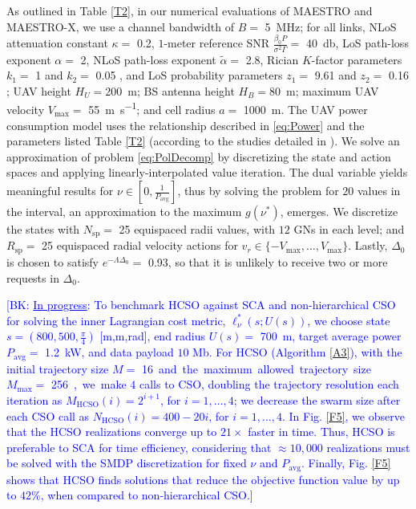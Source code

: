 \documentclass[12pt, draftcls, onecolumn]{IEEEtran}
\theoremstyle{plain}
\theoremstyle{definition}
\theoremstyle{remark}
\newcommand{\bk}[1]{\textcolor{blue}{[BK: #1]}}
\begin{document}
As outlined in Table \ref{T2}, in our numerical evaluations of MAESTRO and MAESTRO-X, we use a channel bandwidth of $B=$ \qty[mode=text]{5}{\mega\hertz}; for all links, NLoS attenuation constant $\kappa=$ \qty[mode=text]{0.2}{}, $1$-meter reference SNR $\frac{\beta_{0}P}{\sigma^{2}\Gamma}=$ \qty[mode=text]{40}{\decibel}, LoS path-loss exponent $\alpha=$ \qty[mode=text]{2}{}, NLoS path-loss exponent $\tilde{\alpha}=$ \qty[mode=text]{2.8}{}, Rician $K$-factor parameters $k_{1}=$ \qty[mode=text]{1}{} and $k_{2}=$ \qty[mode=text]{0.05}{} \cite{Rician}, and LoS probability parameters $z_{1}=$ \qty[mode=text]{9.61}{} and $z_{2}=$ \qty[mode=text]{0.16}{} \cite{OptimalAltitude}; UAV height $H_{U}=$\qty[mode=text]{200}{\meter}; BS antenna height $H_{B}=$\qty[mode=text]{80}{\meter}; maximum UAV velocity $V_{\mathrm{max}}=$ \qty[mode=text]{55}{\meter\per\second}; and cell radius $a=$ \qty[mode=text]{1000}{\meter}. The UAV power consumption model uses the relationship described in \eqref{eq:Power} and the parameters listed Table \ref{T2} (according to the studies detailed in \cite{SCA}). We solve an approximation of problem \eqref{eq:PolDecomp} by discretizing the state and action spaces and applying linearly-interpolated value iteration. The dual variable yields meaningful results for $\nu{\in}[0,\frac{1}{P_{\mathrm{avg}}}]$, thus by solving the problem for $20$ values in the interval, an approximation to the maximum $g(\nu^*)$, emerges. We discretize the states with $N_{\mathrm{sp}}=$ \qty[mode=text]{25}{} equispaced radii values, with $12$ GNs in each level; and $R_{\mathrm{sp}}=$ \qty[mode=text]{25}{} equispaced radial velocity actions for $v_r{\in}\{-V_{\mathrm{max}},{\dots},V_{\mathrm{max}}\}$. Lastly, $\Delta_{0}$ is chosen to satisfy $e^{-\Lambda\Delta_{0}}=$ \qty[mode=text]{0.93}{}, so that it is unlikely to receive two or more requests in $\Delta_{0}$.

\bk{\underline{In progress}: To benchmark HCSO against SCA and non-hierarchical CSO for solving the inner Lagrangian cost metric, $\ell_{\nu}^{*}(s;U(s))$, we choose state $s{=}(800,500,\frac{\pi}{4})$ [m,m,rad], end radius $U(s)=$ \qty[mode=text]{700}{\meter}, target average power $P_{\mathrm{avg}}=$ \qty[mode=text]{1.2}{\kilo\watt}, and data payload $10$ Mb. For HCSO (Algorithm \ref{A3}), with the initial trajectory size $M=$ \qty[mode=text]{16} and the maximum allowed trajectory size $M_{\mathrm{max}}=$ \qty[mode=text]{256}, we make $4$ calls to CSO, doubling the trajectory resolution each iteration as $M_{\mathrm{HCSO}}(i){=}2^{i{+}1}$, for $i{=}1,{\dots},4$; we decrease the swarm size after each CSO call as $N_{\mathrm{HCSO}}(i){=}400{-}20i$, for $i{=}1,{\dots},4$. In Fig. \ref{F5}, we observe that the HCSO realizations converge up to $21{\times}$ faster in time. Thus, HCSO is preferable to SCA for time efficiency, considering that ${\approx}10,000$ realizations must be solved with the SMDP discretization for fixed $\nu$ and $P_{\mathrm{avg}}$. Finally, Fig. \ref{F5} shows that HCSO finds solutions that reduce the objective function value by up to $42\%$, when compared to non-hierarchical CSO.} 
\end{document}
